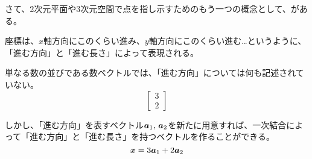 \documentclass[../../imaging-math]{subfiles}
\begin{document}
\br

さて、2次元平面や3次元空間で点を指し示すためのもう一つの概念として、がある。

座標は、$x$軸方向にこのくらい進み、$y$軸方向にこのくらい進む…というように、「進む方向」と「進む長さ」によって表現される。

\br

単なる数の並びである数ベクトルでは、「進む方向」については何も記述されていない。
\begin{equation*}
  \begin{bmatrix}
    3 \\
    2
  \end{bmatrix}
\end{equation*}

しかし、「進む方向」を表すベクトル$\vb*{a}_1,\,\vb*{a}_2$を新たに用意すれば、一次結合によって「進む方向」と「進む長さ」を持つベクトルを作ることができる。
\begin{equation*}
  \vb*{x} = 3 \vb*{a}_1 + 2 \vb*{a}_2
\end{equation*}
\end{document}
